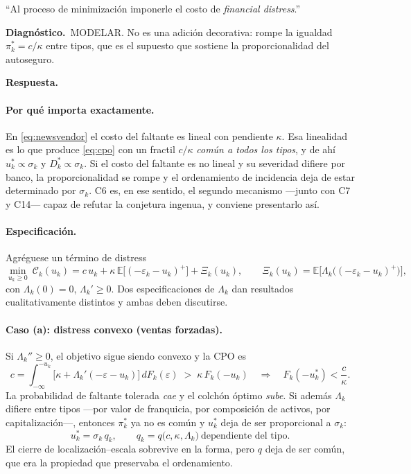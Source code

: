 \documentclass[11pt]{article}
\newcommand{\diag}[1]{\par\noindent\textbf{Diagn\'ostico.}\ #1\par}
\newcommand{\resp}{\par\noindent\textbf{Respuesta.}\par}
\newcommand{\E}{\mathbb{E}}
\theoremstyle{definition}
\begin{document}
\begin{jurado}
``Al proceso de minimizaci\'on imponerle el costo de \emph{financial distress}.''
\end{jurado}

\diag{MODELAR. No es una adici\'on decorativa: rompe la igualdad
$\pi^*_k=c/\kappa$ entre tipos, que es el supuesto que sostiene la
proporcionalidad del autoseguro.}

\resp

\paragraph{Por qu\'e importa exactamente.} En \eqref{eq:newsvendor} el costo del
faltante es lineal con pendiente $\kappa$. Esa linealidad es lo que produce
\eqref{eq:cpo} con un fractil $c/\kappa$ \emph{com\'un a todos los tipos}, y de
ah\'i $u^*_k\propto\sigma_k$ y $D^*_k\propto\sigma_k$. Si el costo del faltante es
no lineal y su severidad difiere por banco, la proporcionalidad se rompe y el
ordenamiento de incidencia deja de estar determinado por $\sigma_k$. C6 es, en
ese sentido, el segundo mecanismo ---junto con C7 y C14--- capaz de refutar la
conjetura ingenua, y conviene presentarlo as\'i.

\paragraph{Especificaci\'on.} Agr\'eguese un t\'ermino de distress
\begin{equation}
\min_{u_k\ge0}\ \mathcal{C}_k(u_k)=c\,u_k+\kappa\,\E\big[(-\varepsilon_k-u_k)^+\big]
+\Xi_k(u_k),
\qquad
\Xi_k(u_k)=\E\Big[\Lambda_k\big((-\varepsilon_k-u_k)^+\big)\Big],
\label{eq:distress}
\end{equation}
con $\Lambda_k(0)=0$, $\Lambda_k'\ge0$. Dos especificaciones de $\Lambda_k$ dan
resultados cualitativamente distintos y ambas deben discutirse.

\paragraph{Caso (a): distress convexo (ventas forzadas).} Si $\Lambda_k''\ge0$,
el objetivo sigue siendo convexo y la CPO es
\begin{equation}
c=\int_{-\infty}^{-u_k}\big[\kappa+\Lambda_k'(-\varepsilon-u_k)\big]\,dF_k(\varepsilon)
\;>\;\kappa\,F_k(-u_k)
\quad\Longrightarrow\quad
F_k(-u^*_k)<\frac{c}{\kappa}.
\label{eq:cpodistress}
\end{equation}
La probabilidad de faltante tolerada \emph{cae} y el colch\'on \'optimo
\emph{sube}. Si adem\'as $\Lambda_k$ difiere entre tipos ---por valor de
franquicia, por composici\'on de activos, por capitalizaci\'on---, entonces
$\pi^*_k$ ya no es com\'un y $u^*_k$ deja de ser proporcional a $\sigma_k$:
\begin{equation}
u^*_k=\sigma_k\,q_k,\qquad q_k=q\big(c,\kappa,\Lambda_k\big)\ \text{dependiente del tipo.}
\label{eq:qk}
\end{equation}
El cierre de localizaci\'on--escala sobrevive en la forma, pero $q$ deja de ser
com\'un, que era la propiedad que preservaba el ordenamiento.
\end{document}
